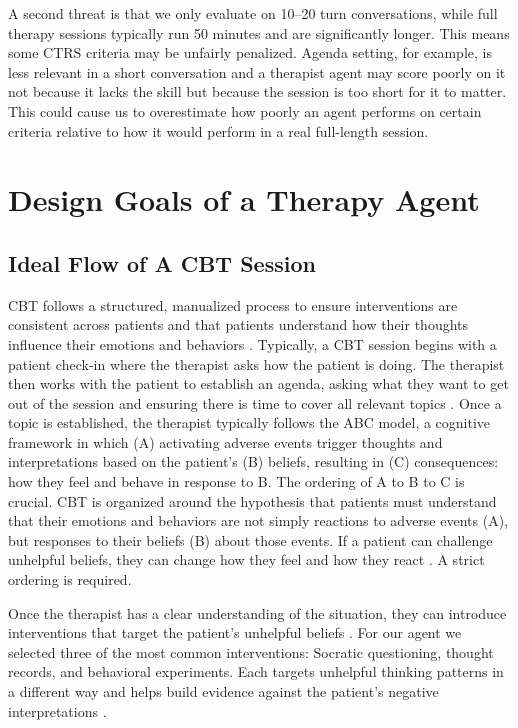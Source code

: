 \documentclass[twoside]{report}
\begin{document}
A second threat is that we only evaluate on 10--20 turn conversations, while full therapy sessions typically run 50 minutes and are significantly longer. This means some CTRS criteria may be unfairly penalized. Agenda setting, for example, is less relevant in a short conversation and a therapist agent may score poorly on it not because it lacks the skill but because the session is too short for it to matter. This could cause us to overestimate how poorly an agent performs on certain criteria relative to how it would perform in a real full-length session.

\chapter{Design Goals of a Therapy Agent}
\section{Ideal Flow of A CBT Session}

CBT follows a structured, manualized process to ensure interventions are consistent across patients and that patients understand how their thoughts influence their emotions and behaviors \cite{raines2021start}. Typically, a CBT session begins with a patient check-in where the therapist asks how the patient is doing. The therapist then works with the patient to establish an agenda, asking what they want to get out of the session and ensuring there is time to cover all relevant topics \cite{beckinstitute2019structure}.
Once a topic is established, the therapist typically follows the ABC model, a cognitive framework in which (A) activating adverse events trigger thoughts and interpretations based on the patient's (B) beliefs, resulting in (C) consequences: how they feel and behave in response to B. The ordering of A to B to C is crucial. CBT is organized around the hypothesis that patients must understand that their emotions and behaviors are not simply reactions to adverse events (A), but responses to their beliefs (B) about those events. If a patient can challenge unhelpful beliefs, they can change how they feel and how they react \cite{ellis2001feeling}. A strict ordering is required.

Once the therapist has a clear understanding of the situation, they can introduce interventions that target the patient's unhelpful beliefs \cite{raines2021start}. For our agent we selected three of the most common interventions: Socratic questioning, thought records, and behavioral experiments. Each targets unhelpful thinking patterns in a different way and helps build evidence against the patient's negative interpretations \cite{raines2021start}.
\end{document}
